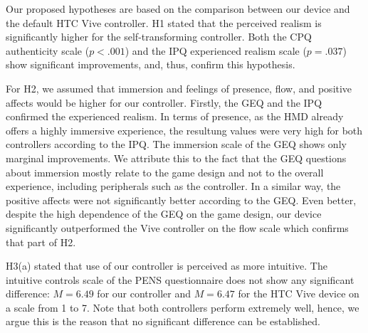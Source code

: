 \documentclass{sigchi}
\begin{document}

Our proposed hypotheses are based on the comparison between our device and the default HTC Vive controller. H1 stated that the perceived realism is significantly higher for the self-transforming controller. Both the CPQ authenticity scale ($p < .001$) and the IPQ experienced realism scale ($p = .037$) show significant improvements, and, thus, confirm this hypothesis.

For H2, we assumed that immersion and feelings of presence, flow, and positive affects would be higher for our controller. Firstly, the GEQ and the IPQ confirmed the experienced realism. In terms of presence, as the HMD already offers a highly immersive experience, the resultung values were very high for both controllers according to the IPQ. The immersion scale of the GEQ shows only marginal improvements. We attribute this to the fact that the GEQ questions about immersion mostly relate to the game design and not to the overall experience, including peripherals such as the controller. In a similar way, the positive affects were not significantly better according to the GEQ. Even better, despite the high dependence of the GEQ on the game design, our device significantly outperformed the Vive controller on the flow scale which confirms that part of H2.

H3(a) stated that use of our controller is perceived as more intuitive. The intuitive controls scale of the PENS questionnaire does not show any significant difference: $M = 6.49$ for our controller and $M = 6.47$ for the HTC Vive device on a scale from 1 to 7. Note that both controllers perform extremely well, hence, we argue this is the reason that no significant difference can be established. 
\end{document}
